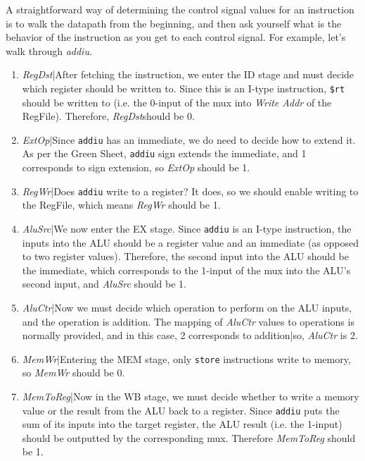 \documentclass{article}
\begin{document}
A straightforward way of determining the control signal values for an instruction is to walk the datapath from the beginning, and then ask yourself what is the behavior of the instruction as you get to each control signal. For example, let's walk through \textit{addiu}. 
\begin{enumerate}
\item \textit{RegDst}|After fetching the instruction, we enter the ID stage and must decide which register should be written to. Since this is an I-type instruction, \texttt{\$rt} should be written to (i.e. the 0-input of the mux into \textit{Write Addr} of the RegFile). Therefore, \textit{RegDst}should be 0.
\item \textit{ExtOp}|Since \texttt{addiu} has an immediate, we do need to decide how to extend it. As per the Green Sheet, \texttt{addiu} sign extends the immediate, and 1 corresponds to sign extension, so \textit{ExtOp} should be 1.
\item \textit{RegWr}|Does \texttt{addiu} write to a register? It does, so we should enable writing to the RegFile, which means \textit{RegWr} should be 1.
\item \textit{AluSrc}|We now enter the EX stage. Since \texttt{addiu} is an I-type instruction, the inputs into the ALU should be a register value and an immediate (as opposed to two register values). Therefore, the second input into the ALU should be the immediate, which corresponds to the 1-input of the mux into the ALU's second input, and \textit{AluSrc} should be 1.
\item \textit{AluCtr}|Now we must decide which operation to perform on the ALU inputs, and the operation is addition. The mapping of \textit{AluCtr} values to operations is normally provided, and in this case, 2 corresponds to addition|so, \textit{AluCtr} is 2.
\item \textit{MemWr}|Entering the MEM stage, only \texttt{store} instructions write to memory, so \textit{MemWr} should be 0.
\item \textit{MemToReg}|Now in the WB stage, we must decide whether to write a memory value or the result from the ALU back to a register. Since \texttt{addiu} puts the sum of its inputs into the target register, the ALU result (i.e. the 1-input) should be outputted by the corresponding mux. Therefore \textit{MemToReg} should be 1.
\end{enumerate}
\end{document}
